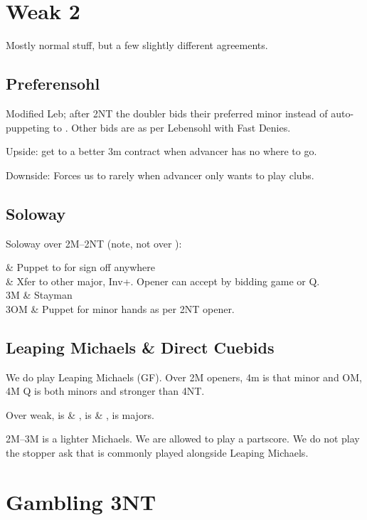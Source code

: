 \documentclass[tom-ari]{subfile}
\begin{document}
	\section{Weak 2}
	
	Mostly normal stuff, but a few slightly different agreements.
	
	\subsection{Preferensohl}
	
	Modified Leb; after 2NT the doubler bids their preferred minor instead of auto-puppeting to . Other bids are as per Lebensohl with Fast Denies.
	
	Upside: get to a better 3m contract when advancer has no where to go.
	
	Downside: Forces us to  rarely when advancer only wants to play clubs. 
	
	\subsection{Soloway}

	Soloway over 2M--2NT (note, not over ):
	
	\begin{bidtable}{}
		 & Puppet to  for sign off anywhere \\
		 & Xfer to other major, Inv+. Opener can accept by bidding game or Q. \\
		3M & Stayman \\
		3OM & Puppet for minor hands as per 2NT opener. \\
	\end{bidtable}

	\subsection{Leaping Michaels \& Direct Cuebids}
	
	We do play Leaping Michaels (GF). Over 2M openers, 4m is that minor and OM, 4M Q is both minors and stronger than 4NT. 
	
	Over  weak,  is \ccc \& \hhh,  is \ccc \& \sss,  is majors.
	
	2M--3M is a lighter Michaels. We are allowed to play a partscore. We do not play the stopper ask that is commonly played alongside Leaping Michaels.
		
	\section{Gambling 3NT}
	
\end{document}
